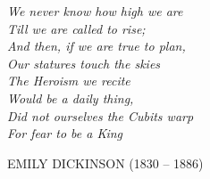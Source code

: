 \clearpage

\thispagestyle{empty}
\null\vfill


{%
    \centering
    \raggedright{\itshape%
    We never know how high we are \\ 
    Till we are called to rise; \\
    And then, if we are true to plan, \\ 
    Our statures touch the skies\\
    The Heroism we recite \\ 
    Would be a daily thing, \\
    Did not ourselves the Cubits warp \\ 
    For fear to be a King\par
    }   
    \raggedleft\MakeUppercase{Emily Dickinson} (1830 – 1886)\par%
}

\vfill\vfill

\clearpage